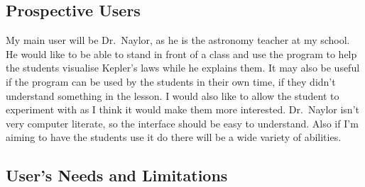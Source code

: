 \subsection{Prospective Users}
My main user will be Dr.~Naylor, as he is the
astronomy teacher at my school. He would like to be able to stand in front of a
class and use the program to help the students visualise Kepler's laws while he
explains them. It may also be useful if the program can be used by the students
in their own time, if they didn't understand something in the lesson. I would
also like to allow the student to experiment with as I think it would make them
more interested. Dr.~Naylor isn't very computer literate, so the interface
should be easy to understand. Also if I'm aiming to have the students use it do
there will be a wide variety of abilities. 


\subsection{User's Needs and Limitations} 


